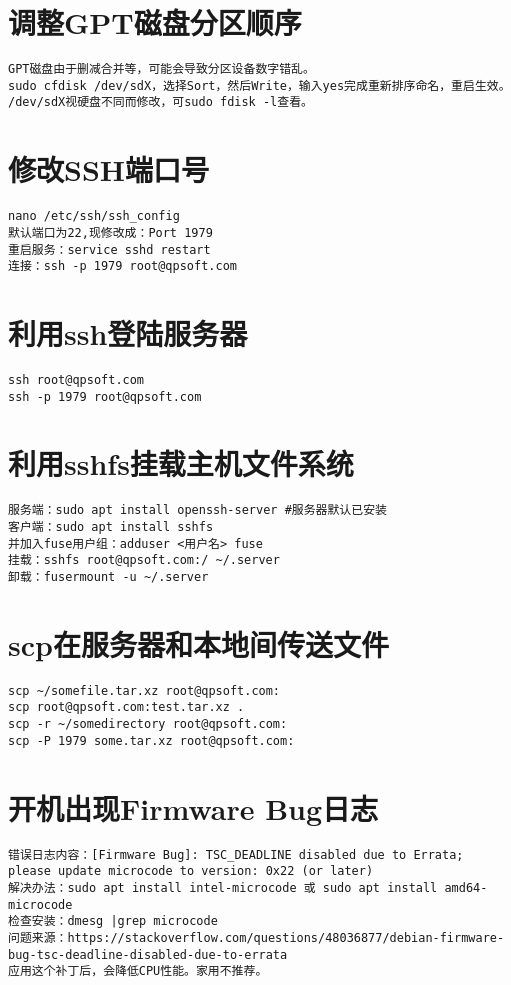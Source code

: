 \documentclass[a4paper,fontset=fandol,zihao=-4,linespread=1.2,oneside]{ctexbook}
\begin{document}
\section{调整GPT磁盘分区顺序}
\begin{lstlisting}
GPT磁盘由于删减合并等，可能会导致分区设备数字错乱。
sudo cfdisk /dev/sdX，选择Sort，然后Write，输入yes完成重新排序命名，重启生效。
/dev/sdX视硬盘不同而修改，可sudo fdisk -l查看。
\end{lstlisting}

\section{修改SSH端口号}
\begin{lstlisting}
nano /etc/ssh/ssh_config
默认端口为22,现修改成：Port 1979
重启服务：service sshd restart
连接：ssh -p 1979 root@qpsoft.com
\end{lstlisting}

\section{利用ssh登陆服务器}
\begin{lstlisting}
ssh root@qpsoft.com
ssh -p 1979 root@qpsoft.com
\end{lstlisting}

\section{利用sshfs挂载主机文件系统}
\begin{lstlisting}
服务端：sudo apt install openssh-server #服务器默认已安装
客户端：sudo apt install sshfs
并加入fuse用户组：adduser <用户名> fuse
挂载：sshfs root@qpsoft.com:/ ~/.server
卸载：fusermount -u ~/.server
\end{lstlisting}

\section{scp在服务器和本地间传送文件}
\begin{lstlisting}
scp ~/somefile.tar.xz root@qpsoft.com:
scp root@qpsoft.com:test.tar.xz .
scp -r ~/somedirectory root@qpsoft.com:
scp -P 1979 some.tar.xz root@qpsoft.com:
\end{lstlisting}

\section{开机出现Firmware Bug日志}
\begin{lstlisting}
错误日志内容：[Firmware Bug]: TSC_DEADLINE disabled due to Errata; please update microcode to version: 0x22 (or later)
解决办法：sudo apt install intel-microcode 或 sudo apt install amd64-microcode
检查安装：dmesg |grep microcode
问题来源：https://stackoverflow.com/questions/48036877/debian-firmware-bug-tsc-deadline-disabled-due-to-errata
应用这个补丁后，会降低CPU性能。家用不推荐。
\end{lstlisting}
\end{document}
